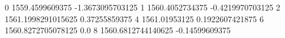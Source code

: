 0 1559.4599609375 -1.3673095703125
1 1560.4052734375 -0.4219970703125
2 1561.1998291015625 0.37255859375
4 1561.01953125 0.1922607421875
6 1560.8272705078125 0.0
8 1560.6812744140625 -0.14599609375
